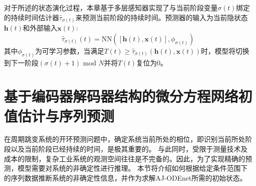 对于所述的状态演化过程，本章基于多层感知器实现了与当前阶段变量${\sigma(t)}$绑定的持续时间估计器$\hat{\tau}_{{\sigma(t)}}$来预测当前阶段的持续时间。预测器的输入为当前隐状态$\boldsymbol{h}(t)$和外部输入$\boldsymbol{x}(t)$:
\begin{equation}
\hat{\tau}_{\sigma(t)}(t)=\text{NN}\left([\boldsymbol{h}(t), \boldsymbol{x}(t)], \phi_{\sigma(t)}\right)
\end{equation}
其中$\phi_{\sigma(t)}$为可学习参数，当满足$T(t)\geq\hat{\tau}_{\sigma(t)}(\boldsymbol{h}(t),\boldsymbol{x}(t))$时，模型将切换到下一阶段$(\sigma(t)+1)\text{ mod } N$并将$T(t)$复位为0。
\section{基于编码器解码器结构的微分方程网络初值估计与序列预测}
\label{sec:encoder_decoder}
在周期跳变系统的开环预测问题中，确定系统当前所处的相位，即识别当前所处阶段以及当前阶段已经持续的时间，是极其重要的。
与此同时，受限于测量技术及成本的限制，复杂工业系统的观测空间往往是不完备的。因此，为了实现精确的预测，模型需要对系统的非确定性进行推理。
本节将介绍如何根据给定条件范围下的序列数据推断系统的非确定性信息，并作为求解AJ-ODEnet所需的初始状态。


